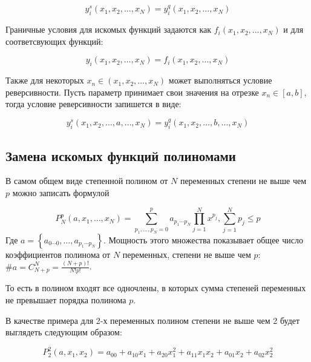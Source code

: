 \documentclass[a4paper,12pt]{article}
\begin{document}
  \begin{equation}
    y_i^s\left(x_1,x_2,\ldots,x_N\right) = y_i^q\left(x_1,x_2,\ldots,x_N\right)
  \end{equation}

  Граничные условия для искомых функций задаются как 
  $f_i\left(x_1,x_2,\ldots,x_N\right)$ и для соответсвующих функций:

  \begin{equation}
    y_i\left(x_1,x_2,\ldots,x_N\right) = f_i\left(x_1,x_2,\ldots,x_N\right)
  \end{equation}
  
  Также для некоторых $x_n \in \left(x_1,x_2,\ldots,x_N\right)$ может
  выполняться условие реверсивности. Пусть параметр принимает свои
  значения на отрезке $x_n \in [a,b]$, тогда условие реверсивности запишется в виде:

  \begin{equation}
    y_i^s\left(x_1,x_2,\ldots,a,\ldots,x_N\right) = y_i^q\left(x_1,x_2,\ldots,b,\ldots,x_N\right)
  \end{equation}


  \subsection{Замена искомых функций полиномами}


  В самом общем виде степенной полином от $N$ переменных степени не выше чем $p$ можно
  записать формулой
  
  \begin{equation}
    P_N^p(a,x_1,\ldots,x_N)=
    \displaystyle\sum_{p_1,\ldots,p_N=0}^{p}a_{p_1 \cdots p_N}\prod_{j=1}^{N}x^{p_j},
    \displaystyle\sum_{j=1}^{N}p_j \le p
  \end{equation}
  Где $a = \left\{ a_{0 \cdots 0},\ldots,a_{p_1 \cdots p_N} \right\}$.
  Мощность этого множества показывает общее число
  коэффициентов полинома от $N$ переменных, степени не выше чем $p$:
  $ \#a = C_{N+p}^N = \frac{(N+p)!}{N!p!}$.
  
  То есть в полином входят все одночлены, в которых сумма степеней
  переменных не превышает порядка полинома $p$.

  В качестве примера для 2-х переменных полином степени не выше чем 2
  будет выглядеть следующим образом:

  \begin{equation*}
    P_2^2(a,x_1,x_2) = a_{00} + a_{10}x_1 + a_{20}x_1^2+ a_{11}x_1x_2 + a_{01}x_2 + a_{02}x_2^2
  \end{equation*}
\end{document}
